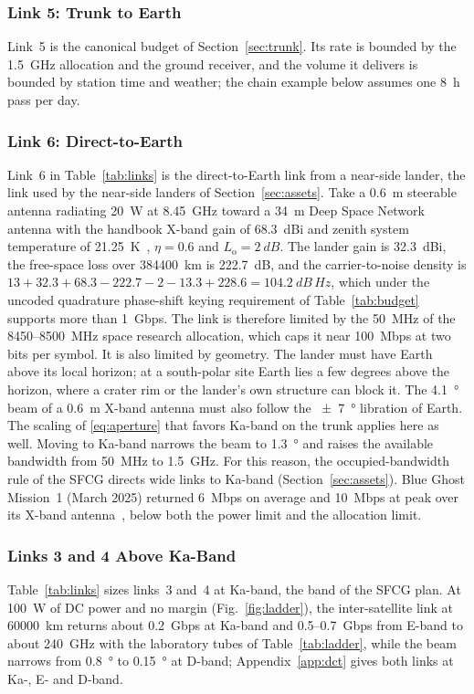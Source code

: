 \documentclass{IEEEoj}
\begin{document}
\subsubsection{Link 5: Trunk to Earth}
Link~5 is the canonical budget of Section~\ref{sec:trunk}. Its rate is bounded by the \SI{1.5}{GHz} allocation and the ground receiver, and the volume it delivers is bounded by station time and weather; the chain example below assumes one \SI{8}{h} pass per day.

\subsubsection{Link 6: Direct-to-Earth}
Link~6 in Table~\ref{tab:links} is the direct-to-Earth link from a near-side lander, the link used by the near-side landers of Section~\ref{sec:assets}. Take a \SI{0.6}{m} steerable antenna radiating \SI{20}{W} at \SI{8.45}{GHz} toward a \SI{34}{m} Deep Space Network antenna with the handbook X-band gain of \SI{68.3}{dBi} and zenith system temperature of \SI{21.25}{K}~\cite{dsn_34m_bwg}, $\eta = 0.6$ and $L_{\mathrm{o}} = \SI{2}{dB}$. The lander gain is \SI{32.3}{dBi}, the free-space loss over \SI{384400}{km} is \SI{222.7}{dB}, and the carrier-to-noise density is $13 + 32.3 + 68.3 - 222.7 - 2 - 13.3 + 228.6 = \SI{104.2}{dB\,Hz}$, which under the uncoded quadrature phase-shift keying requirement of Table~\ref{tab:budget} supports more than \SI{1}{Gbps}. The link is therefore limited by the \SI{50}{MHz} of the \SI{8450}{}--\SI{8500}{MHz} space research allocation, which caps it near \SI{100}{Mbps} at two bits per symbol. It is also limited by geometry. The lander must have Earth above its local horizon; at a south-polar site Earth lies a few degrees above the horizon, where a crater rim or the lander's own structure can block it. The \SI{4.1}{\degree} beam of a \SI{0.6}{m} X-band antenna must also follow the \SI{\pm 7}{\degree} libration of Earth. The scaling of \eqref{eq:aperture} that favors Ka-band on the trunk applies here as well. Moving to Ka-band narrows the beam to \SI{1.3}{\degree} and raises the available bandwidth from \SI{50}{MHz} to \SI{1.5}{GHz}. For this reason, the occupied-bandwidth rule of the SFCG directs wide links to Ka-band (Section~\ref{sec:assets}). Blue Ghost Mission~1 (March 2025) returned \SI{6}{Mbps} on average and \SI{10}{Mbps} at peak over its X-band antenna~\cite{nssdca_bgm1}, below both the power limit and the allocation limit.

\subsubsection{Links 3 and 4 Above Ka-Band}
Table~\ref{tab:links} sizes links~3 and~4 at Ka-band, the band of the SFCG plan. At \SI{100}{W} of DC power and no margin (Fig.~\ref{fig:ladder}), the inter-satellite link at \SI{60000}{km} returns about \SI{0.2}{Gbps} at Ka-band and \SI{0.5}{}--\SI{0.7}{Gbps} from E-band to about \SI{240}{GHz} with the laboratory tubes of Table~\ref{tab:ladder}, while the beam narrows from \SI{0.8}{\degree} to \SI{0.15}{\degree} at D-band; Appendix~\ref{app:dct} gives both links at Ka-, E- and D-band.
\end{document}
